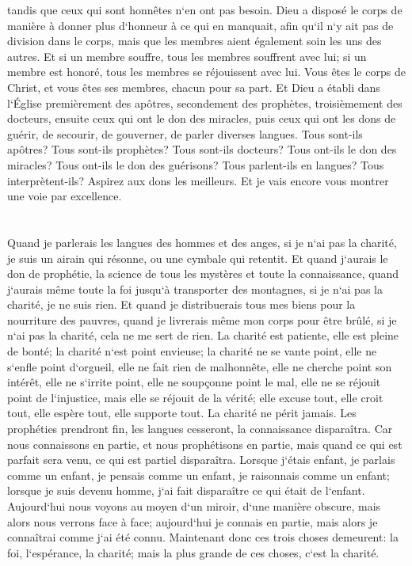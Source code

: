 \verse tandis que ceux qui sont honnêtes n`en ont pas besoin. Dieu a disposé le corps de manière à donner plus d`honneur à ce qui en manquait, 
\verse afin qu`il n`y ait pas de division dans le corps, mais que les membres aient également soin les uns des autres. 
\verse Et si un membre souffre, tous les membres souffrent avec lui; si un membre est honoré, tous les membres se réjouissent avec lui. 
\verse Vous êtes le corps de Christ, et vous êtes ses membres, chacun pour sa part. 
\verse Et Dieu a établi dans l`Église premièrement des apôtres, secondement des prophètes, troisièmement des docteurs, ensuite ceux qui ont le don des miracles, puis ceux qui ont les dons de guérir, de secourir, de gouverner, de parler diverses langues. 
\verse Tous sont-ils apôtres? Tous sont-ils prophètes? Tous sont-ils docteurs? 
\verse Tous ont-ils le don des miracles? Tous ont-ils le don des guérisons? Tous parlent-ils en langues? Tous interprètent-ils? 
\verse Aspirez aux dons les meilleurs. Et je vais encore vous montrer une voie par excellence. 

\chapter{}

\verse Quand je parlerais les langues des hommes et des anges, si je n`ai pas la charité, je suis un airain qui résonne, ou une cymbale qui retentit. 
\verse Et quand j`aurais le don de prophétie, la science de tous les mystères et toute la connaissance, quand j`aurais même toute la foi jusqu`à transporter des montagnes, si je n`ai pas la charité, je ne suis rien. 
\verse Et quand je distribuerais tous mes biens pour la nourriture des pauvres, quand je livrerais même mon corps pour être brûlé, si je n`ai pas la charité, cela ne me sert de rien. 
\verse La charité est patiente, elle est pleine de bonté; la charité n`est point envieuse; la charité ne se vante point, elle ne s`enfle point d`orgueil, 
\verse elle ne fait rien de malhonnête, elle ne cherche point son intérêt, elle ne s`irrite point, elle ne soupçonne point le mal, 
\verse elle ne se réjouit point de l`injustice, mais elle se réjouit de la vérité; 
\verse elle excuse tout, elle croit tout, elle espère tout, elle supporte tout. 
\verse La charité ne périt jamais. Les prophéties prendront fin, les langues cesseront, la connaissance disparaîtra. 
\verse Car nous connaissons en partie, et nous prophétisons en partie, 
\verse mais quand ce qui est parfait sera venu, ce qui est partiel disparaîtra. 
\verse Lorsque j`étais enfant, je parlais comme un enfant, je pensais comme un enfant, je raisonnais comme un enfant; lorsque je suis devenu homme, j`ai fait disparaître ce qui était de l`enfant. 
\verse Aujourd`hui nous voyons au moyen d`un miroir, d`une manière obscure, mais alors nous verrons face à face; aujourd`hui je connais en partie, mais alors je connaîtrai comme j`ai été connu. 
\verse Maintenant donc ces trois choses demeurent: la foi, l`espérance, la charité; mais la plus grande de ces choses, c`est la charité. 

